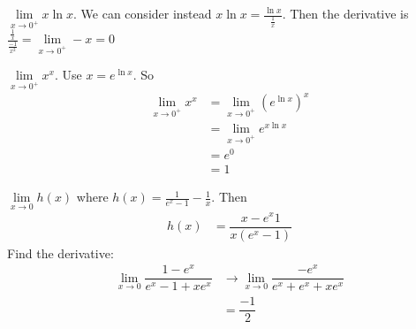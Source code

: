 \documentclass{report}
\begin{document}
\begin{examples}
    \begin{example}
        $\lim\limits_{x \to 0^{+}} x\ln{x}$. We can consider instead $x\ln{x} = \frac{\ln{x}}{\frac{1}{x}}$. Then the derivative is $\frac{\frac{1}{x}}{\frac{-1}{x^{2}}} = \lim\limits_{x \to 0^{+}}-x = 0$ 
    \end{example}
    \begin{example}
        $\lim\limits_{x \to 0^{+}}x^{x}$. Use $x = e^{\ln{x}}$. So
            \begin{align*}
                \lim\limits_{x \to  0^{+}}x^{x} &= \lim\limits_{x \to 0^{+}}(e^{\ln{x}})^{x} \\
                                                &= \lim\limits_{x \to 0^{+}}e^{x\ln{x}}      \\
                                                &= e^{0}                                     \\
                                                &= 1                                           
            \end{align*}
    \end{example}
    \begin{example}
        $\lim\limits_{x \to 0}h(x)$ where $h(x) = \frac{1}{e^{x} - 1} - \frac{1}{x}$. Then
            \begin{align*}
                h(x) &= \dfrac{x - e^{x} 1}{x(e^{x} - 1)}   
            \end{align*}
        Find the derivative:
            \begin{align*}
                \lim\limits_{x \to 0}\dfrac{1 - e^{x}}{e^{x} - 1 + xe^{x}} &\rightarrow  \lim\limits_{x \to 0}\dfrac{-e^{x}}{e^{x} + e^{x} + xe^{x}} \\
                                                                           &=           \dfrac{-1}{2}                                                  
            \end{align*}
    \end{example}
\end{examples}
\end{document}
